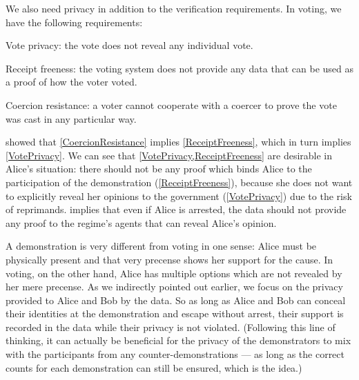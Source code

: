 We also need privacy in addition to the verification requirements.
In voting, we have the following requirements:
\begin{frame}
\begin{requirements}[P]
\item\label{VotePrivacy} Vote privacy: the vote does not reveal any individual 
  vote.
\item\label{ReceiptFreeness} Receipt freeness: the voting system does not 
  provide any data that can be used as a proof of how the voter voted.
\item\label{CoercionResistance} Coercion resistance: a voter cannot cooperate 
  with a coercer to prove the vote was cast in any particular way.
\end{requirements}
\end{frame}
\Textcite{VerifyingPrivacyPropertiesOfVotingProtocols} showed that 
\cref{CoercionResistance} implies \cref{ReceiptFreeness}, which in turn implies
\cref{VotePrivacy}.
We can see that \cref{VotePrivacy,ReceiptFreeness} are desirable in Alice's 
situation: there should not be any proof which binds Alice to the participation 
of the demonstration (\cref{ReceiptFreeness}), because she does not want to 
explicitly reveal her opinions to the government (\cref{VotePrivacy}) due to 
the risk of reprimands.
 implies that even if Alice is arrested, the data should 
not provide any proof to the regime's agents that can reveal Alice's opinion.

A demonstration is very different from voting in one sense: Alice must be 
physically present and that very precense shows her support for the cause.
In voting, on the other hand, Alice has multiple options which are not revealed
by her mere precense.
As we indirectly pointed out earlier, we focus on the privacy provided to Alice 
and Bob by the data.
So as long as Alice and Bob can conceal their identities at the demonstration 
and escape without arrest, their support is recorded in the data while their 
privacy is not violated.
(Following this line of thinking, it can actually be beneficial for the privacy of 
the demonstrators to mix with the participants from any counter-demonstrations 
--- as long as the correct counts for each demonstration can still be ensured, 
which is the idea.)

